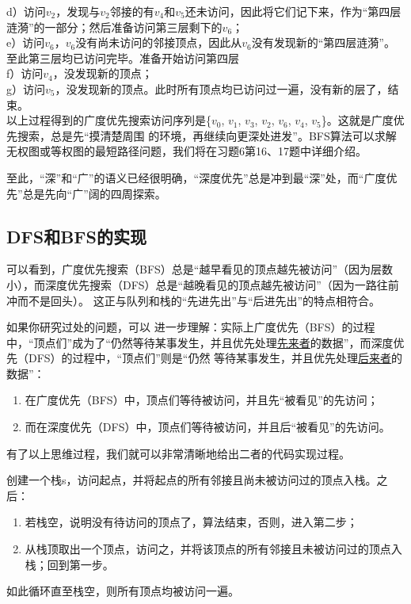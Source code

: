 \noindent d）访问$v_2$，发现与$v_2$邻接的有$v_4$和$v_5$还未访问，因此将它们记下来，作为“第四层涟漪”的一部分；然后准备访问第三层剩下的$v_6$；\\[0.3em]
e）访问$v_6$，$v_6$没有尚未访问的邻接顶点，因此从$v_6$没有发现新的“第四层涟漪”。至此第三层均已访问完毕。准备开始访问第四层\\[0.3em]
f）访问$v_4$，没发现新的顶点；\\[0.3em]
g）访问$v_5$，没发现新的顶点。此时所有顶点均已访问过一遍，没有新的层了，结束。\\[0.3em]

以上过程得到的广度优先搜索访问序列是\{$v_0$, $v_1$, $v_3$, $v_2$, $v_6$, $v_4$, $v_5$\}。这就是广度优先搜索，总是先“摸清楚周围
的环境，再继续向更深处进发”。BFS算法可以求解无权图或等权图的最短路径问题，我们将在{\color{red}习题6第16、17题}中详细介绍。

至此，“深”和“广”的语义已经很明确，“深度优先”总是冲到最“深”处，而“广度优先”总是先向“广”阔的四周探索。




\subsection{DFS和BFS的实现}
可以看到，广度优先搜索（BFS）总是“越早看见的顶点越先被访问”（因为层数小），而深度优先搜索（DFS）总是“越晚看见的顶点越先被访问”（因为一路往前冲而不是回头）。
这正与队列和栈的“先进先出”与“后进先出”的特点相符合。

如果你研究过处的问题，可以
进一步理解：实际上广度优先（BFS）的过程中，“顶点们”成为了“仍然等待某事发生，并且优先处理\uline{先来者}的数据”，而深度优先（DFS）的过程中，“顶点们”则是“仍然
等待某事发生，并且优先处理\uline{后来者}的数据”：
\begin{enumerate}
    \item 在广度优先（BFS）中，顶点们等待被访问，并且先“被看见”的先访问；
    \item 而在深度优先（DFS）中，顶点们等待被访问，并且后“被看见”的先访问。
\end{enumerate}

有了以上思维过程，我们就可以非常清晰地给出二者的代码实现过程。

创建一个栈s，访问起点，并将起点的所有邻接且尚未被访问过的顶点入栈。之后：
\begin{enumerate}
    \item 若栈空，说明没有待访问的顶点了，算法结束，否则，进入第二步；
    \item 从栈顶取出一个顶点，访问之，并将该顶点的所有邻接且未被访问过的顶点入栈；回到第一步。
\end{enumerate}
如此循环直至栈空，则所有顶点均被访问一遍。

